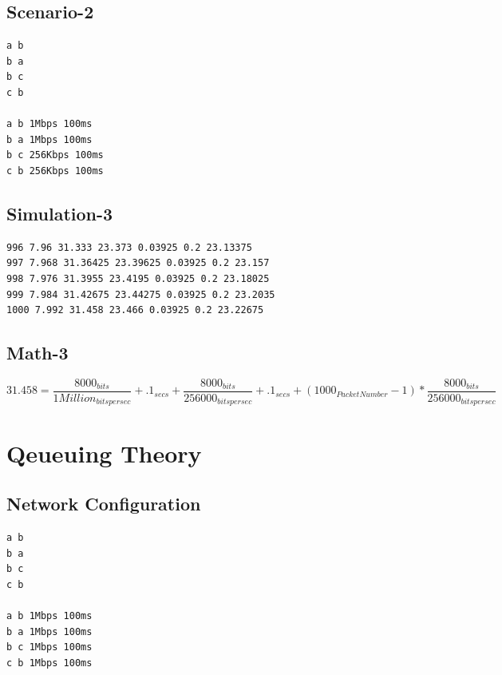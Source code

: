 \documentclass{article}
\begin{document}
\subsection{Scenario-2}
\begin{verbatim}
a b
b a
b c
c b

a b 1Mbps 100ms
b a 1Mbps 100ms
b c 256Kbps 100ms
c b 256Kbps 100ms
\end{verbatim}
\subsection{Simulation-3}
\begin{verbatim}
996 7.96 31.333 23.373 0.03925 0.2 23.13375
997 7.968 31.36425 23.39625 0.03925 0.2 23.157
998 7.976 31.3955 23.4195 0.03925 0.2 23.18025
999 7.984 31.42675 23.44275 0.03925 0.2 23.2035
1000 7.992 31.458 23.466 0.03925 0.2 23.22675
\end{verbatim}
\subsection{Math-3}
\begin{equation}
    31.458 = \frac {8000_{bits}}{1Million_{bitspersec}} + .1_{secs} + \frac{8000_{bits}}{256000_{bitspersec}} + .1_{secs} + (1000_{PacketNumber}-1) * \frac {8000_{bits}}{256000_{bitspersec}}
\end{equation}
\section{Qeueuing Theory}
\subsection{Network Configuration}
\begin{verbatim}
a b
b a
b c
c b

a b 1Mbps 100ms
b a 1Mbps 100ms
b c 1Mbps 100ms
c b 1Mbps 100ms
\end{verbatim}
\end{document}
